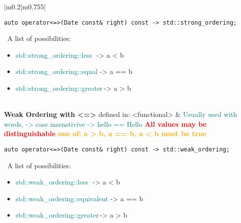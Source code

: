 \documentclass[main.tex,fontsize=8pt,paper=a4,paper=portrait,DIV=calc,]{scrartcl}
\begin{document}
\begin{table}[ht!]
\begin{tabular}{|m{0.2\linewidth}|m{0.755\linewidth}|}
\begin{lstlisting}
auto operator<=>(Date const& right) const -> std::strong_ordering;
\end{lstlisting}
\, \newline
A list of possibilities:\newline
\begin{itemize}
  \item \textcolor{teal}{std::strong\_ordering::less} \,\,-> a < b 
  \item \textcolor{teal}{std::strong\_ordering::equal}\,\,-> a == b 
  \item \textcolor{teal}{std::strong\_ordering::greater}\,-> a > b 
  \vspace{-3mm}
\end{itemize}\\
\hline
\textbf{Weak Ordering with <=>}\newline
defined in: <functional> & 
\textcolor{teal}{Usually used with words, -> case insenstivive -> hello == Hello}\newline
\textcolor{red}{\textbf{All values may be distinguishable}}\newline
\textcolor{orange}{\textbf{one of: a > b, a == b, a < b must be true}}\newline
\begin{lstlisting}
auto operator<=>(Date const& right) const -> std::weak_ordering;
\end{lstlisting}
\, \newline
A list of possibilities:\newline
\begin{itemize}
  \item \textcolor{teal}{std::weak\_ordering::less} \,\,-> a < b 
  \item \textcolor{teal}{std::weak\_ordering::equivalent}\,\,-> a == b 
  \item \textcolor{teal}{std::weak\_ordering::greater}\,-> a > b 
  \vspace{-3mm}
\end{itemize}\\
\hline
\end{tabular}
\end{table}
\pagebreak
\end{document}
